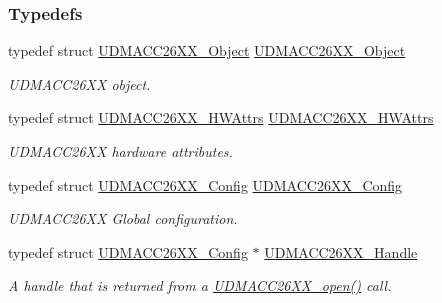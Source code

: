 \subsubsection*{Typedefs}
\begin{DoxyCompactItemize}
\item 
typedef struct \hyperlink{struct_u_d_m_a_c_c26_x_x___object}{U\+D\+M\+A\+C\+C26\+X\+X\+\_\+\+Object} \hyperlink{_u_d_m_a_c_c26_x_x_8h_a3645577cacce45f1ad3b4879e3ef5afc}{U\+D\+M\+A\+C\+C26\+X\+X\+\_\+\+Object}
\begin{DoxyCompactList}\small\item\em U\+D\+M\+A\+C\+C26\+X\+X object. \end{DoxyCompactList}\item 
typedef struct \hyperlink{struct_u_d_m_a_c_c26_x_x___h_w_attrs}{U\+D\+M\+A\+C\+C26\+X\+X\+\_\+\+H\+W\+Attrs} \hyperlink{_u_d_m_a_c_c26_x_x_8h_ac9e26a57f30a829b5b2e3174e1df812f}{U\+D\+M\+A\+C\+C26\+X\+X\+\_\+\+H\+W\+Attrs}
\begin{DoxyCompactList}\small\item\em U\+D\+M\+A\+C\+C26\+X\+X hardware attributes. \end{DoxyCompactList}\item 
typedef struct \hyperlink{struct_u_d_m_a_c_c26_x_x___config}{U\+D\+M\+A\+C\+C26\+X\+X\+\_\+\+Config} \hyperlink{_u_d_m_a_c_c26_x_x_8h_a59acc64eb8db50a7a37b44fb4fa5fad1}{U\+D\+M\+A\+C\+C26\+X\+X\+\_\+\+Config}
\begin{DoxyCompactList}\small\item\em U\+D\+M\+A\+C\+C26\+X\+X Global configuration. \end{DoxyCompactList}\item 
typedef struct \hyperlink{struct_u_d_m_a_c_c26_x_x___config}{U\+D\+M\+A\+C\+C26\+X\+X\+\_\+\+Config} $\ast$ \hyperlink{_u_d_m_a_c_c26_x_x_8h_a969a9feb0f822c4764ef1da2ff5066cf}{U\+D\+M\+A\+C\+C26\+X\+X\+\_\+\+Handle}
\begin{DoxyCompactList}\small\item\em A handle that is returned from a \hyperlink{_u_d_m_a_c_c26_x_x_8h_aa7a244c7cfec8551f11ad5d4b5afa0ff}{U\+D\+M\+A\+C\+C26\+X\+X\+\_\+open()} call. \end{DoxyCompactList}\end{DoxyCompactItemize}
